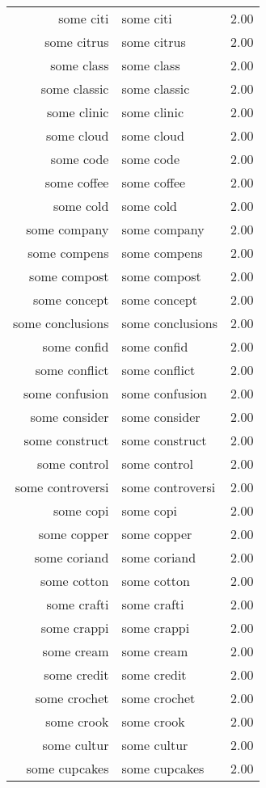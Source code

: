 \begin{table}[ht]
\begin{tabular}{rlr}
  some citi & some citi & 2.00 \\ 
  some citrus & some citrus & 2.00 \\ 
  some class & some class & 2.00 \\ 
  some classic & some classic & 2.00 \\ 
  some clinic & some clinic & 2.00 \\ 
  some cloud & some cloud & 2.00 \\ 
  some code & some code & 2.00 \\ 
  some coffee & some coffee & 2.00 \\ 
  some cold & some cold & 2.00 \\ 
  some company & some company & 2.00 \\ 
  some compens & some compens & 2.00 \\ 
  some compost & some compost & 2.00 \\ 
  some concept & some concept & 2.00 \\ 
  some conclusions & some conclusions & 2.00 \\ 
  some confid & some confid & 2.00 \\ 
  some conflict & some conflict & 2.00 \\ 
  some confusion & some confusion & 2.00 \\ 
  some consider & some consider & 2.00 \\ 
  some construct & some construct & 2.00 \\ 
  some control & some control & 2.00 \\ 
  some controversi & some controversi & 2.00 \\ 
  some copi & some copi & 2.00 \\ 
  some copper & some copper & 2.00 \\ 
  some coriand & some coriand & 2.00 \\ 
  some cotton & some cotton & 2.00 \\ 
  some crafti & some crafti & 2.00 \\ 
  some crappi & some crappi & 2.00 \\ 
  some cream & some cream & 2.00 \\ 
  some credit & some credit & 2.00 \\ 
  some crochet & some crochet & 2.00 \\ 
  some crook & some crook & 2.00 \\ 
  some cultur & some cultur & 2.00 \\ 
  some cupcakes & some cupcakes & 2.00 \\ 

\end{tabular}
\end{table}
